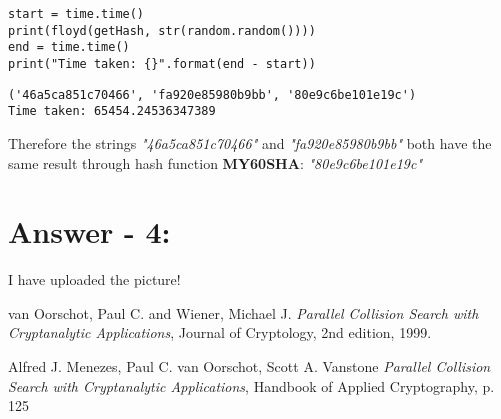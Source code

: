 \documentclass[10pt,a4paper,oneside]{article}
\begin{document}
\begin{itemize}
\begin{lstlisting}
start = time.time()
print(floyd(getHash, str(random.random())))
end = time.time()
print("Time taken: {}".format(end - start))
\end{lstlisting}

\begin{lstlisting}
('46a5ca851c70466', 'fa920e85980b9bb', '80e9c6be101e19c')
Time taken: 65454.24536347389
\end{lstlisting}

Therefore the strings \textit{"46a5ca851c70466"} and \textit{"fa920e85980b9bb"} both have the same result through hash function \textbf{MY60SHA}: \textit{"80e9c6be101e19c"}
\end{itemize}

\section*{Answer - 4:}

I have uploaded the picture!





\medskip

\begin{thebibliography}{9}
  van Oorschot, Paul C. and Wiener, Michael J.
  \textit{Parallel Collision Search with Cryptanalytic Applications},
  Journal of Cryptology,
  2nd edition,
  1999.

  Alfred J. Menezes, Paul C. van Oorschot, Scott A. Vanstone
  \textit{Parallel Collision Search with Cryptanalytic Applications},
  Handbook of Applied Cryptography,
  p. 125


\end{thebibliography}
\end{document}
